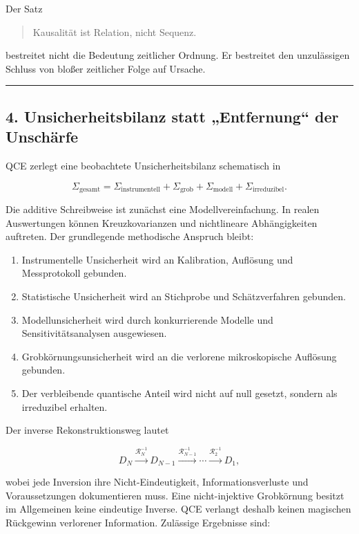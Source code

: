 \documentclass[
  11pt,
  a4paper,
]{article}
\providecommand{\tightlist}{%
  \setlength{\itemsep}{0pt}\setlength{\parskip}{0pt}}
\begin{document}
Der Satz

\begin{quote}
Kausalität ist Relation, nicht Sequenz.
\end{quote}

bestreitet nicht die Bedeutung zeitlicher Ordnung. Er bestreitet den
unzulässigen Schluss von bloßer zeitlicher Folge auf Ursache.

\begin{center}\rule{0.5\linewidth}{0.5pt}\end{center}

\subsection{4. Unsicherheitsbilanz statt „Entfernung`` der
Unschärfe}\label{unsicherheitsbilanz-statt-entfernung-der-unschuxe4rfe}

QCE zerlegt eine beobachtete Unsicherheitsbilanz schematisch in

\[
\Sigma_{\text{gesamt}}
=
\Sigma_{\text{instrumentell}}
+
\Sigma_{\text{grob}}
+
\Sigma_{\text{modell}}
+
\Sigma_{\text{irreduzibel}}.
\]

Die additive Schreibweise ist zunächst eine Modellvereinfachung. In
realen Auswertungen können Kreuzkovarianzen und nichtlineare
Abhängigkeiten auftreten. Der grundlegende methodische Anspruch bleibt:

\begin{enumerate}
\def\labelenumi{\arabic{enumi}.}
\tightlist
\item
  Instrumentelle Unsicherheit wird an Kalibration, Auflösung und
  Messprotokoll gebunden.
\item
  Statistische Unsicherheit wird an Stichprobe und Schätzverfahren
  gebunden.
\item
  Modellunsicherheit wird durch konkurrierende Modelle und
  Sensitivitätsanalysen ausgewiesen.
\item
  Grobkörnungsunsicherheit wird an die verlorene mikroskopische
  Auflösung gebunden.
\item
  Der verbleibende quantische Anteil wird nicht auf null gesetzt,
  sondern als irreduzibel erhalten.
\end{enumerate}

Der inverse Rekonstruktionsweg lautet

\[
D_N
\xrightarrow{\mathcal R_N^{-1}}
D_{N-1}
\xrightarrow{\mathcal R_{N-1}^{-1}}
\cdots
\xrightarrow{\mathcal R_2^{-1}}
D_1,
\]

wobei jede Inversion ihre Nicht-Eindeutigkeit, Informationsverluste und
Voraussetzungen dokumentieren muss. Eine nicht-injektive Grobkörnung
besitzt im Allgemeinen keine eindeutige Inverse. QCE verlangt deshalb
keinen magischen Rückgewinn verlorener Information. Zulässige Ergebnisse
sind:
\end{document}
